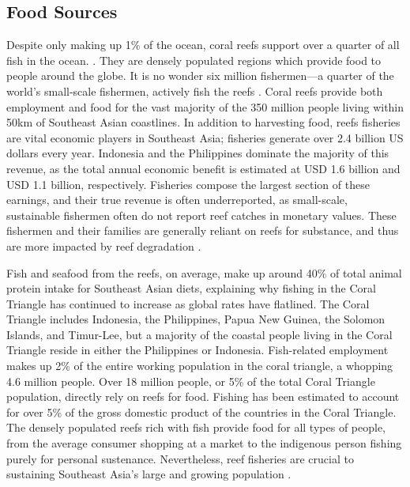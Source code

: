 \documentclass{book}\usepackage{knitr}
\begin{document}
\subsection{Food Sources}

Despite only making up 1\% of the ocean, coral reefs support over a quarter of all fish in the ocean. \citep{noaa}. They are densely populated regions which provide food to people around the globe. It is no wonder six million fishermen—a quarter of the world's small-scale fishermen, actively fish the reefs \citep{coralreefalliance_2021}. Coral reefs provide both employment and food for the vast majority of the 350 million people living within 50km of Southeast Asian coastlines. In addition to harvesting food, reefs fisheries are vital economic players in Southeast Asia; fisheries generate over 2.4 billion US dollars every year. Indonesia and the Philippines dominate the majority of this revenue, as the total annual economic benefit is estimated at USD 1.6 billion and USD 1.1 billion, respectively.  Fisheries compose the largest section of these earnings, and their true revenue is often underreported, as small-scale, sustainable fishermen often do not report reef catches in monetary values. These fishermen and their families are generally reliant on reefs for substance, and thus are more impacted by reef degradation \citep{RAR}.

Fish and seafood from the reefs, on average, make up around 40\% of total animal protein intake for Southeast Asian diets, explaining why fishing in the Coral Triangle has continued to increase as global rates have flatlined. The Coral Triangle includes Indonesia, the Philippines, Papua New Guinea, the Solomon Islands, and Timur-Lee, but a majority of the coastal people living in the Coral Triangle reside in either the Philippines or Indonesia. Fish-related employment makes up 2\% of the entire working population in the coral triangle, a whopping 4.6 million people. Over 18 million people, or 5\% of the total Coral Triangle population, directly rely on reefs for food. Fishing has been estimated to account for over 5\% of the gross domestic product of the countries in the Coral Triangle. The densely populated reefs rich with fish provide food for all types of people, from the average consumer shopping at a market to the indigenous person fishing purely for personal sustenance. Nevertheless, reef fisheries are crucial to sustaining Southeast Asia’s large and growing population \citep{coraltriangle}.
\end{document}
